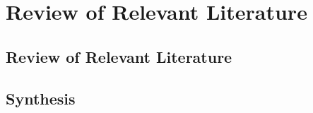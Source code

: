 \documentclass[../main]{subfiles}
\begin{document}
\chapter{Review of Relevant Literature}

\section{Review of Relevant Literature}

\section{Synthesis}
\end{document}

